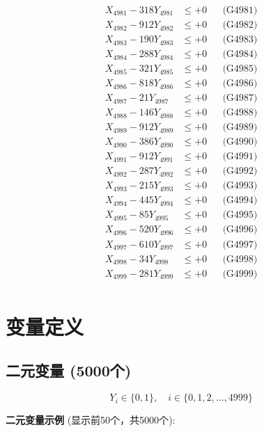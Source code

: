 \documentclass[a4paper,10pt]{article}
\begin{document}
{\begin{align}
\allowbreak
X_{4981} - 318Y_{4981} &\leq +0 && \text{(G4981)} \\
X_{4982} - 912Y_{4982} &\leq +0 && \text{(G4982)} \\
X_{4983} - 190Y_{4983} &\leq +0 && \text{(G4983)} \\
X_{4984} - 288Y_{4984} &\leq +0 && \text{(G4984)} \\
X_{4985} - 321Y_{4985} &\leq +0 && \text{(G4985)} \\
X_{4986} - 818Y_{4986} &\leq +0 && \text{(G4986)} \\
X_{4987} - 21Y_{4987} &\leq +0 && \text{(G4987)} \\
X_{4988} - 146Y_{4988} &\leq +0 && \text{(G4988)} \\
X_{4989} - 912Y_{4989} &\leq +0 && \text{(G4989)} \\
X_{4990} - 386Y_{4990} &\leq +0 && \text{(G4990)} \\
\allowbreak
X_{4991} - 912Y_{4991} &\leq +0 && \text{(G4991)} \\
X_{4992} - 287Y_{4992} &\leq +0 && \text{(G4992)} \\
X_{4993} - 215Y_{4993} &\leq +0 && \text{(G4993)} \\
X_{4994} - 445Y_{4994} &\leq +0 && \text{(G4994)} \\
X_{4995} - 85Y_{4995} &\leq +0 && \text{(G4995)} \\
X_{4996} - 520Y_{4996} &\leq +0 && \text{(G4996)} \\
X_{4997} - 610Y_{4997} &\leq +0 && \text{(G4997)} \\
X_{4998} - 34Y_{4998} &\leq +0 && \text{(G4998)} \\
X_{4999} - 281Y_{4999} &\leq +0 && \text{(G4999)} \\
\end{align}
}

\section{变量定义}

\subsection{二元变量 (5000个)}

\begin{equation}
Y_i \in \{0,1\}, \quad i \in \{0, 1, 2, \ldots, 4999\}
\end{equation}

\textbf{二元变量示例} (显示前50个，共5000个):
\end{document}
